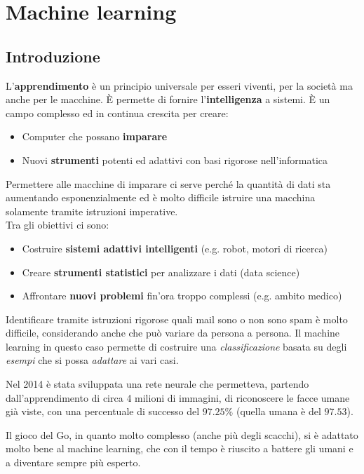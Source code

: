 \newpage
\section{Machine learning}
\subsection{Introduzione}
L'\textbf{apprendimento} è un principio universale per esseri viventi, per la società ma anche per le macchine. È permette di fornire l'\textbf{intelligenza} a sistemi. È un campo complesso ed in continua crescita per creare:
\begin{itemize}
	\item Computer che possano \textbf{imparare}
	\item Nuovi \textbf{strumenti} potenti ed adattivi con basi rigorose nell'informatica
\end{itemize}
Permettere alle macchine di imparare ci serve perché la quantità di dati sta aumentando esponenzialmente ed è molto difficile istruire una macchina solamente tramite istruzioni imperative.\\
Tra gli obiettivi ci sono:
\begin{itemize}
	\item Costruire \textbf{sistemi adattivi intelligenti} (e.g. robot, motori di ricerca)
	\item Creare \textbf{strumenti statistici} per analizzare i dati (data science)
	\item Affrontare \textbf{nuovi problemi} fin'ora troppo complessi (e.g. ambito medico)
\end{itemize}
\begin{example}
	\label{example:email_spam}
	Identificare tramite istruzioni rigorose quali mail sono o non sono spam è molto difficile, considerando anche che può variare da persona a persona. Il machine learning in questo caso permette di costruire una \textit{classificazione} basata su degli \textit{esempi} che si possa \textit{adattare} ai vari casi.
\end{example}
\begin{example}
	Nel 2014 è stata sviluppata una rete neurale che permetteva, partendo dall'apprendimento di circa 4 milioni di immagini, di riconoscere le facce umane già viste, con una percentuale di successo del $97.25\%$ (quella umana è del $97.53$).
\end{example}
\begin{example}[Go]
	Il gioco del Go, in quanto molto complesso (anche più degli scacchi), si è adattato molto bene al machine learning, che con il tempo è riuscito a battere gli umani e a diventare sempre più esperto.
\end{example}

